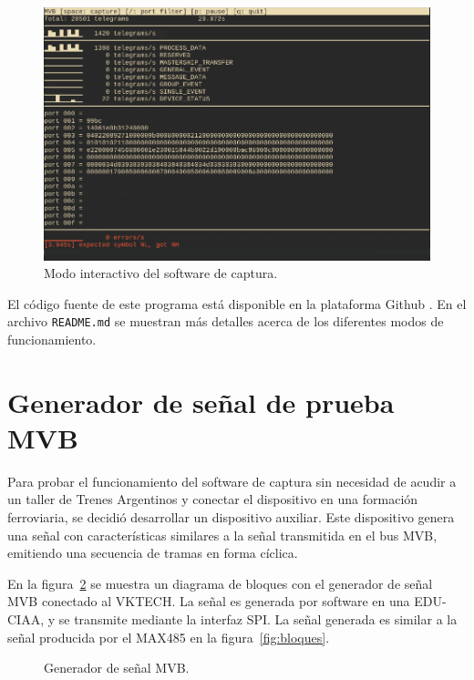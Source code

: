 \begin{figure}[htbp]
	\centering
	\includegraphics[width=1\textwidth]{./Figures/modo-interactivo.png}
	\caption{Modo interactivo del software de captura.}
    \label{fig:interactivo}
\end{figure}

El código fuente de este programa está disponible en la plataforma Github \cite{mvbparse-go}.
En el archivo \texttt{README.md} se muestran más detalles acerca de los diferentes modos de funcionamiento.

\section{Generador de señal de prueba MVB}
\label{sec:generador}

Para probar el funcionamiento del software de captura sin necesidad de acudir a un taller de Trenes Argentinos y conectar el dispositivo en una formación ferroviaria, se decidió desarrollar un dispositivo auxiliar. Este dispositivo genera una señal con características similares a la señal transmitida en el bus MVB, emitiendo una secuencia de tramas en forma cíclica.

En la figura~\ref{fig:generador} se muestra un diagrama de bloques con el generador de señal MVB conectado al VKTECH. La señal es generada por software en una EDU-CIAA, y se transmite mediante la interfaz SPI. La señal generada es similar a la señal producida por el MAX485 en la figura~\ref{fig:bloques}.

\begin{figure}[htbp]
	\centering
    {
        \fontsize{8pt}{8pt}\selectfont
        
    }
	\caption{Generador de señal MVB.}
    \label{fig:generador}
\end{figure}

